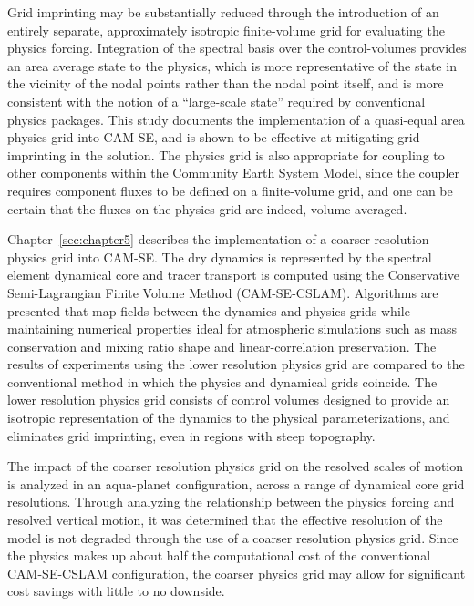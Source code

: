 Grid imprinting may be substantially reduced through the introduction of an entirely separate, approximately isotropic finite-volume grid for evaluating the physics forcing. Integration of the spectral basis over the control-volumes provides an area average state to the physics, which is more representative of the state in the vicinity of the nodal points rather than the nodal point itself, and is more consistent with the notion of a ``large-scale state'' required by conventional physics packages. This study documents the implementation of a quasi-equal area physics grid into CAM-SE, and is shown to be effective at mitigating grid imprinting in the solution. The physics grid is also appropriate for coupling to other components within the Community Earth System Model, since the coupler requires component fluxes to be defined on a finite-volume grid, and one can be certain that the fluxes on the physics grid are indeed, volume-averaged.

Chapter~\ref{sec:chapter5} describes the implementation of a coarser resolution physics grid into CAM-SE. The dry dynamics is represented by the spectral element dynamical core and tracer transport is computed using the Conservative Semi-Lagrangian Finite Volume Method (CAM-SE-CSLAM). Algorithms are presented that map fields between the dynamics and physics grids while maintaining numerical properties ideal for atmospheric simulations such as mass conservation and mixing ratio shape and linear-correlation preservation. The results of experiments using the lower resolution physics grid are compared to the conventional method in which the physics and dynamical grids coincide. The lower resolution physics grid consists of control volumes designed to provide an isotropic representation of the dynamics to the physical parameterizations, and eliminates grid imprinting, even in regions with steep topography. 

The impact of the coarser resolution physics grid on the resolved scales of motion is analyzed in an aqua-planet configuration, across a range of dynamical core grid resolutions. Through analyzing the relationship between the physics forcing and resolved vertical motion, it was determined that the effective resolution of the model is not degraded through the use of a coarser resolution physics grid. Since the physics makes up about half the computational cost of the conventional CAM-SE-CSLAM configuration, the coarser physics grid may allow for significant cost savings with little to no downside.

